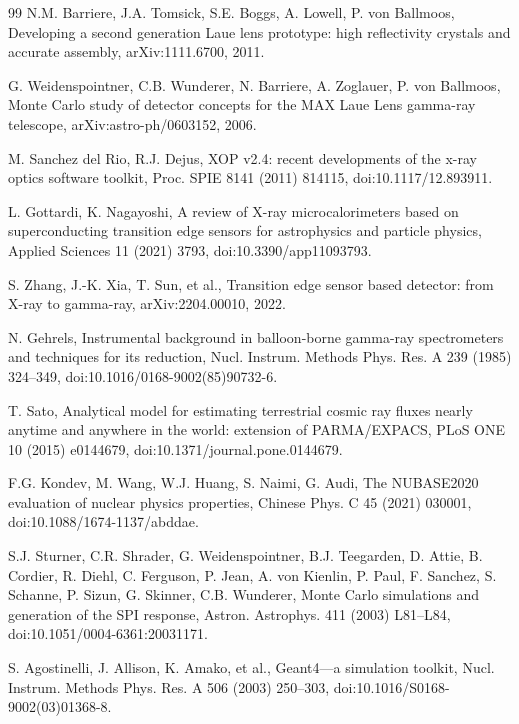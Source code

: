 \documentclass[preprint,12pt]{elsarticle}
\begin{document}
\begin{thebibliography}{99}
N.M. Barriere, J.A. Tomsick, S.E. Boggs, A. Lowell, P. von Ballmoos, Developing a second generation Laue lens prototype: high reflectivity crystals and accurate assembly, arXiv:1111.6700, 2011.

G. Weidenspointner, C.B. Wunderer, N. Barriere, A. Zoglauer, P. von Ballmoos, Monte Carlo study of detector concepts for the MAX Laue Lens gamma-ray telescope, arXiv:astro-ph/0603152, 2006.

M. Sanchez del Rio, R.J. Dejus, XOP v2.4: recent developments of the x-ray optics software toolkit, Proc. SPIE 8141 (2011) 814115, doi:10.1117/12.893911.

L. Gottardi, K. Nagayoshi, A review of X-ray microcalorimeters based on superconducting transition edge sensors for astrophysics and particle physics, Applied Sciences 11 (2021) 3793, doi:10.3390/app11093793.

S. Zhang, J.-K. Xia, T. Sun, et al., Transition edge sensor based detector: from X-ray to gamma-ray, arXiv:2204.00010, 2022.

N. Gehrels, Instrumental background in balloon-borne gamma-ray spectrometers and techniques for its reduction, Nucl. Instrum. Methods Phys. Res. A 239 (1985) 324--349, doi:10.1016/0168-9002(85)90732-6.

T. Sato, Analytical model for estimating terrestrial cosmic ray fluxes nearly anytime and anywhere in the world: extension of PARMA/EXPACS, PLoS ONE 10 (2015) e0144679, doi:10.1371/journal.pone.0144679.

F.G. Kondev, M. Wang, W.J. Huang, S. Naimi, G. Audi, The NUBASE2020 evaluation of nuclear physics properties, Chinese Phys. C 45 (2021) 030001, doi:10.1088/1674-1137/abddae.

S.J. Sturner, C.R. Shrader, G. Weidenspointner, B.J. Teegarden, D. Attie, B. Cordier, R. Diehl, C. Ferguson, P. Jean, A. von Kienlin, P. Paul, F. Sanchez, S. Schanne, P. Sizun, G. Skinner, C.B. Wunderer, Monte Carlo simulations and generation of the SPI response, Astron. Astrophys. 411 (2003) L81--L84, doi:10.1051/0004-6361:20031171.

S. Agostinelli, J. Allison, K. Amako, et al., Geant4---a simulation toolkit, Nucl. Instrum. Methods Phys. Res. A 506 (2003) 250--303, doi:10.1016/S0168-9002(03)01368-8.


\end{thebibliography}
\end{document}
